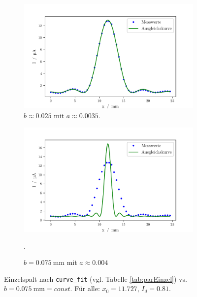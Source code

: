\begin{figure}
    \centering
    \begin{subfigure}{.5\textwidth}
        \centering
        \includegraphics[width=.7\textwidth]{python/EinzelspaltFit.pdf}
        \caption{$b \approx 0.025$ mit $a \approx 0.0035$.}
        \label{fig:lsd3ss}
    \end{subfigure}%
    \begin{subfigure}{.5\textwidth}
        \centering
        \includegraphics[width=.7\linewidth]{python/EinzelspaltFits.pdf}
        \caption{$b = \SI{0.075}{\milli\meter}$ mit $a \approx 0.004$}.
        \label{fig:lsd3s}
    \end{subfigure}
    \caption{Einzelspalt nach \texttt{curve\_fit} (vgl. Tabelle \ref{tab:parEinzel}) vs. $b = \SI{0.075}{\milli\meter} = const$. Für alle: $x_0 = 11.727$, $I_d = 0.81$.}
        \label{fig:ggn2}
    \end{figure}